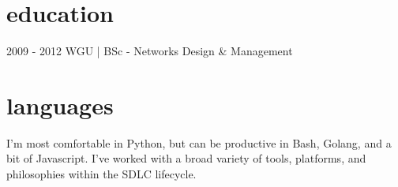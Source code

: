 \documentclass[]{mv_cv}
\begin{document}
\section{education}
\begin{content}
  {2009 - 2012 WGU | BSc - Networks Design \& Management}
\end{content}

\section{languages}
\begin{content}
  {I'm most comfortable in Python, but can be productive in Bash, Golang, and a bit of Javascript. I've worked with a broad variety of tools, platforms, and philosophies within the SDLC lifecycle.}
\end{content}

\thispagestyle{empty}
\end{document}
